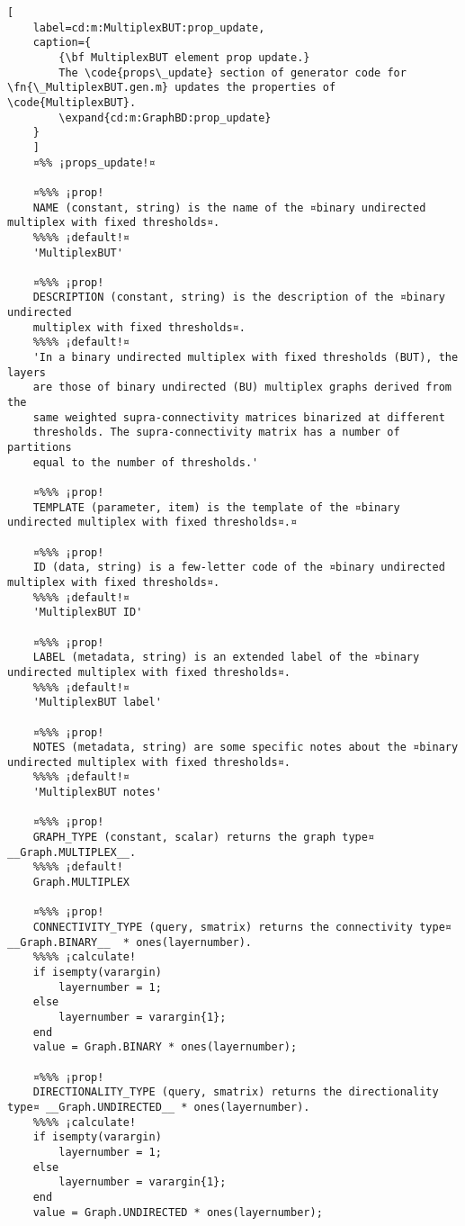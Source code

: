 \documentclass{tufte-handout}
\begin{document}
\begin{lstlisting}[
	label=cd:m:MultiplexBUT:prop_update,
	caption={
		{\bf MultiplexBUT element prop update.}
		The \code{props\_update} section of generator code for \fn{\_MultiplexBUT.gen.m} updates the properties of \code{MultiplexBUT}.
		\expand{cd:m:GraphBD:prop_update}
	}
	]
	¤%% ¡props_update!¤
	
	¤%%% ¡prop!
	NAME (constant, string) is the name of the ¤binary undirected multiplex with fixed thresholds¤.
	%%%% ¡default!¤
	'MultiplexBUT'
	
	¤%%% ¡prop!
	DESCRIPTION (constant, string) is the description of the ¤binary undirected
	multiplex with fixed thresholds¤.
	%%%% ¡default!¤
	'In a binary undirected multiplex with fixed thresholds (BUT), the layers
	are those of binary undirected (BU) multiplex graphs derived from the
	same weighted supra-connectivity matrices binarized at different
	thresholds. The supra-connectivity matrix has a number of partitions
	equal to the number of thresholds.'

	¤%%% ¡prop!
	TEMPLATE (parameter, item) is the template of the ¤binary undirected multiplex with fixed thresholds¤.¤
	
	¤%%% ¡prop!
	ID (data, string) is a few-letter code of the ¤binary undirected multiplex with fixed thresholds¤.
	%%%% ¡default!¤
	'MultiplexBUT ID'
	
	¤%%% ¡prop!
	LABEL (metadata, string) is an extended label of the ¤binary undirected multiplex with fixed thresholds¤.
	%%%% ¡default!¤
	'MultiplexBUT label'
	
	¤%%% ¡prop!
	NOTES (metadata, string) are some specific notes about the ¤binary undirected multiplex with fixed thresholds¤.
	%%%% ¡default!¤
	'MultiplexBUT notes'
	
	¤%%% ¡prop!
	GRAPH_TYPE (constant, scalar) returns the graph type¤ __Graph.MULTIPLEX__.
	%%%% ¡default!
	Graph.MULTIPLEX
	
	¤%%% ¡prop!
	CONNECTIVITY_TYPE (query, smatrix) returns the connectivity type¤ __Graph.BINARY__  * ones(layernumber).
	%%%% ¡calculate!
	if isempty(varargin)
		layernumber = 1;
	else
		layernumber = varargin{1};
	end
	value = Graph.BINARY * ones(layernumber); 
	
	¤%%% ¡prop!
	DIRECTIONALITY_TYPE (query, smatrix) returns the directionality type¤ __Graph.UNDIRECTED__ * ones(layernumber).
	%%%% ¡calculate!
	if isempty(varargin)
		layernumber = 1;
	else
		layernumber = varargin{1};
	end
	value = Graph.UNDIRECTED * ones(layernumber);
	

\end{lstlisting}
\end{document}
